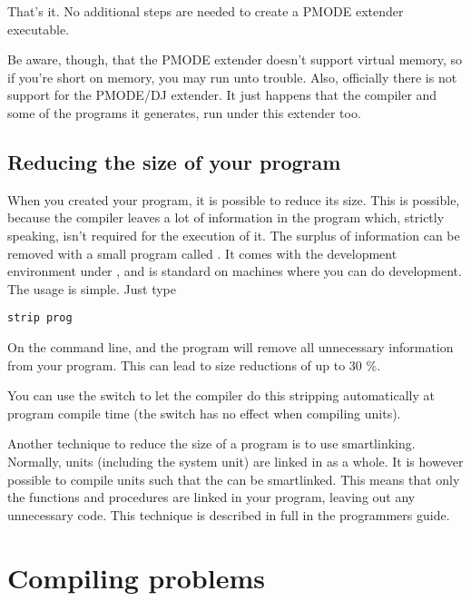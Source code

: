 \documentclass{report}
\begin{document}
That's it. No additional steps are needed to create a PMODE extender
executable.

Be aware, though, that the PMODE extender doesn't support virtual memory, so
if you're short on memory, you may run unto trouble. Also, officially there
is not support for the PMODE/DJ extender. It just happens that the compiler
and some of the programs it generates, run under this extender too.


\section{Reducing the size of your program}

When you created your program, it is possible to reduce its size. This
is possible, because the compiler leaves a lot of information in the
program which, strictly speaking, isn't required for the execution of
it. The surplus of information can be removed with a small program
called . It comes with the  development
environment under \dos, and is standard on \linux machines where you can
do development. The usage is simple. Just type
\begin{verbatim}
strip prog
\end{verbatim}
On the command line, and the  program will remove all unnecessary
information from your program. This can lead to size reductions of up to
30 \%.

You can use the  switch to let the compiler do this stripping
automatically at program compile time (the switch has no effect when
compiling units). 

Another technique to reduce the size of a program is to use smartlinking. 
Normally, units (including the system unit) are linked in as a whole.
It is however possible to compile units such that the can be smartlinked.
This means that only the functions and procedures are linked in your
program, leaving out any unnecessary code. This technique is described in
full in the programmers guide.

\chapter{Compiling problems}
\end{document}
